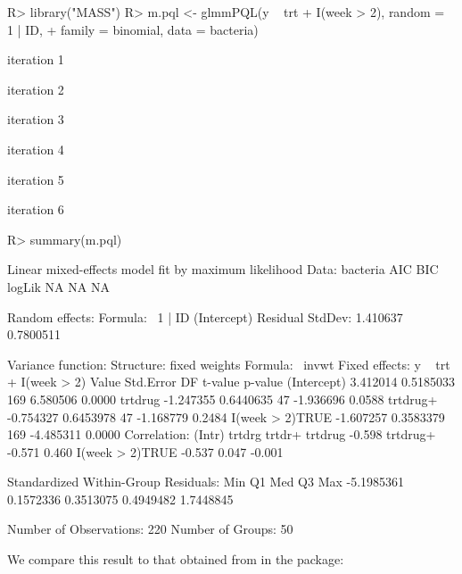 \documentclass[
]{jss}
\begin{document}
\begin{CodeChunk}
\begin{CodeInput}
R> library("MASS")
R> m.pql <- glmmPQL(y ~ trt + I(week > 2), random = ~ 1 | ID,
+              family = binomial, data = bacteria)
\end{CodeInput}
\begin{CodeOutput}
iteration 1
\end{CodeOutput}
\begin{CodeOutput}
iteration 2
\end{CodeOutput}
\begin{CodeOutput}
iteration 3
\end{CodeOutput}
\begin{CodeOutput}
iteration 4
\end{CodeOutput}
\begin{CodeOutput}
iteration 5
\end{CodeOutput}
\begin{CodeOutput}
iteration 6
\end{CodeOutput}
\begin{CodeInput}
R> summary(m.pql)
\end{CodeInput}
\begin{CodeOutput}
Linear mixed-effects model fit by maximum likelihood
  Data: bacteria 
  AIC BIC logLik
   NA  NA     NA

Random effects:
 Formula: ~1 | ID
        (Intercept)  Residual
StdDev:    1.410637 0.7800511

Variance function:
 Structure: fixed weights
 Formula: ~invwt 
Fixed effects:  y ~ trt + I(week > 2) 
                    Value Std.Error  DF   t-value p-value
(Intercept)      3.412014 0.5185033 169  6.580506  0.0000
trtdrug         -1.247355 0.6440635  47 -1.936696  0.0588
trtdrug+        -0.754327 0.6453978  47 -1.168779  0.2484
I(week > 2)TRUE -1.607257 0.3583379 169 -4.485311  0.0000
 Correlation: 
                (Intr) trtdrg trtdr+
trtdrug         -0.598              
trtdrug+        -0.571  0.460       
I(week > 2)TRUE -0.537  0.047 -0.001

Standardized Within-Group Residuals:
       Min         Q1        Med         Q3        Max 
-5.1985361  0.1572336  0.3513075  0.4949482  1.7448845 

Number of Observations: 220
Number of Groups: 50 
\end{CodeOutput}
\end{CodeChunk}

We compare this result to that obtained from  in the
 package:
\end{document}
